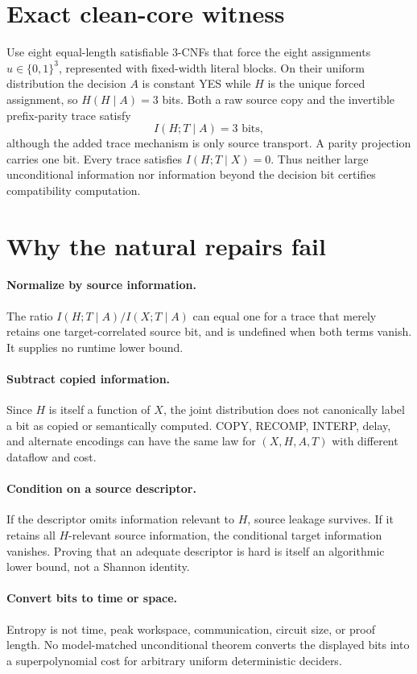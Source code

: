 \documentclass[11pt]{article}
\begin{document}
\section*{Exact clean-core witness}
Use eight equal-length satisfiable 3-CNFs that force the eight assignments
$u\in\{0,1\}^3$, represented with fixed-width literal blocks.  On their
uniform distribution the decision $A$ is constant YES while $H$ is the unique
forced assignment, so $H(H\mid A)=3$ bits.  Both a raw source copy and the
invertible prefix-parity trace satisfy
\[
 I(H;T\mid A)=3\text{ bits},
\]
although the added trace mechanism is only source transport.  A parity
projection carries one bit.  Every trace satisfies
$I(H;T\mid X)=0$.  Thus neither large unconditional information nor
information beyond the decision bit certifies compatibility computation.

\section*{Why the natural repairs fail}
\paragraph{Normalize by source information.}
The ratio $I(H;T\mid A)/I(X;T\mid A)$ can equal one for a trace that merely
retains one target-correlated source bit, and is undefined when both terms
vanish.  It supplies no runtime lower bound.

\paragraph{Subtract copied information.}
Since $H$ is itself a function of $X$, the joint distribution does not
canonically label a bit as copied or semantically computed.  COPY, RECOMP,
INTERP, delay, and alternate encodings can have the same law for
$(X,H,A,T)$ with different dataflow and cost.

\paragraph{Condition on a source descriptor.}
If the descriptor omits information relevant to $H$, source leakage survives.
If it retains all $H$-relevant source information, the conditional target
information vanishes.  Proving that an adequate descriptor is hard is itself
an algorithmic lower bound, not a Shannon identity.

\paragraph{Convert bits to time or space.}
Entropy is not time, peak workspace, communication, circuit size, or proof
length.  No model-matched unconditional theorem converts the displayed bits
into a superpolynomial cost for arbitrary uniform deterministic deciders.
\end{document}
